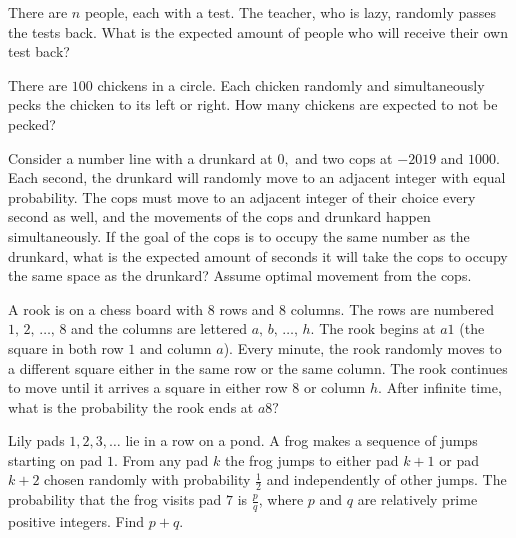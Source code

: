 \documentclass[mast]{lucky}
\begin{document}




    \begin{prob}[]{1}
 There are $n$ people, each with a test. The teacher, who is lazy, randomly passes the tests back. What is the expected amount of people who will receive their own test back?
\end{prob}

    \begin{prob}[MATHCOUNTS 2017]{1}
There are $100$ chickens in a circle. Each chicken randomly and simultaneously pecks the chicken to its left or right. How many chickens are expected to not be pecked?
\end{prob}

\begin{prob}[]{2}
Consider a number line with a drunkard at $0,$ and two cops at $-2019$ and $1000.$ Each second, the drunkard will randomly move to an adjacent integer with equal probability. The cops must move to an adjacent integer of their choice every second as well, and the movements of the cops and drunkard happen simultaneously. If the goal of the cops is to occupy the same number as the drunkard, what is the expected amount of seconds it will take the cops to occupy the same space as the drunkard? Assume optimal movement from the cops.
\end{prob}

\begin{prob}[SMT 2020]{2}
 A rook is on a chess board with $8$ rows and $8$ columns. The rows are numbered $1,\, 2,\, \ldots,\, 8$ and the columns are lettered $a,\, b,\, \ldots,\, h.$ The rook begins at $a1$ (the square in both row $1$ and column $a$). Every minute, the rook randomly moves to a different square either in the same row or the same column. The rook continues to move until it arrives a square in either row $8$ or column $h.$ After infinite time, what is the probability the rook ends at $a8?$
\end{prob}

\begin{prob}[AIME II 2019/2]{2}
 Lily pads $1,2,3,\ldots$ lie in a row on a pond. A frog makes a sequence of jumps starting on pad $1$. From any pad $k$ the frog jumps to either pad $k+1$ or pad $k+2$ chosen randomly with probability $\tfrac{1}{2}$ and independently of other jumps. The probability that the frog visits pad $7$ is $\tfrac{p}{q}$, where $p$ and $q$ are relatively prime positive integers. Find $p+q$.
\end{prob}
\end{document}

